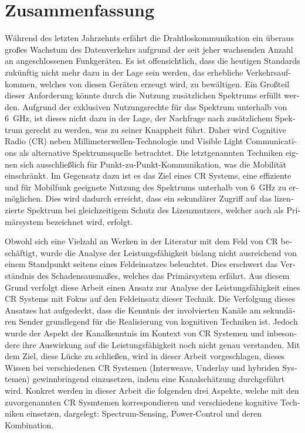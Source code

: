 \chapter*{Zusammenfassung}
\begin{otherlanguage}{german}
W\"ahrend des letzten Jahrzehnts erf\"ahrt die Drahtloskommunikation ein \"uberaus gro\ss es Wachstum des Datenverkehrs aufgrund der seit jeher wachsenden Anzahl an angeschlossenen Funkger\"aten. Es ist offensichtlich, dass die heutigen Standards zuk\"unftig nicht mehr dazu in der Lage sein werden, das erhebliche Verkehrsaufkommen, welches von diesen Ger\"aten erzeugt wird, zu bew\"altigen. Ein Gro\ss teil dieser Anforderung k\"onnte durch die Nutzung zus\"atzlichen Spektrums erf\"ullt werden. Aufgrund der exklusiven Nutzungsrechte f\"ur das Spektrum unterhalb von \SI{6}{GHz}, ist dieses nicht dazu in der Lage, der Nachfrage nach zus\"atzlichem Spektrum gerecht zu werden, was zu seiner Knappheit f\"uhrt. Daher wird Cognitive Radio (CR) neben Millimeterwellen-Technologie und Visible Light Communications als alternative Spektrumsquelle betrachtet. Die letztgenannten Techniken eignen sich ausschlie\ss lich f\"ur Punkt-zu-Punkt-Kommunikation, was die Mobilit\"at einschr\"ankt. Im Gegensatz dazu ist es das Ziel eines CR Systems, eine effiziente und f\"ur Mobilfunk geeignete Nutzung des Spektrums unterhalb von \SI{6}{GHz} zu erm\"oglichen. Dies wird dadurch erreicht, dass ein sekund\"arer Zugriff auf das lizenzierte Spektrum bei gleichzeitigem Schutz des Lizenznutzers, welcher auch als Prim\"arsystem bezeichnet wird, erfolgt. 

Obwohl sich eine Vielzahl an Werken in der Literatur mit dem Feld von CR besch\"aftigt, wurde die Analyse der Leistungsf\"ahigkeit bislang nicht ausreichend von einem Standpunkt seitens eines Feldeinsatzes beleuchtet. Dies erschwert das Verst\"andnis des Schadensausma\ss es, welches das Prim\"arsystem erf\"ahrt. Aus diesem Grund verfolgt diese Arbeit einen Ansatz zur Analyse der Leistungsf\"ahigkeit eines CR Systems mit Fokus auf den Feldeinsatz dieser Technik. Die Verfolgung dieses Ansatzes hat aufgedeckt, dass die Kenntnis der involvierten Kan\"ale am sekund\"aren Sender grundlegend f\"ur die Realisierung von kognitiven Techniken ist. Jedoch wurde der Aspekt der Kanalkenntnis im Kontext von CR Systemen und inbesondere ihre Auswirkung auf die Leistungsf\"ahigkeit noch nicht genau verstanden. Mit dem Ziel, diese L\"ucke zu schlie\ss en, wird in dieser Arbeit vorgeschlagen, dieses Wissen bei verschiedenen CR Systemen (Interweave, Underlay und hybriden Systemen) gewinnbringend einzusetzen, indem eine Kanalsch\"atzung durchgef\"uhrt wird. Konkret werden in dieser Arbeit die folgenden drei Aspekte, welche mit den zuvorgenannten CR Sysmtemen korrespondieren und verschiedene kognitive Techniken einsetzen, dargelegt: Spectrum-Sensing, Power-Control und deren Kombination.


\end{otherlanguage}
